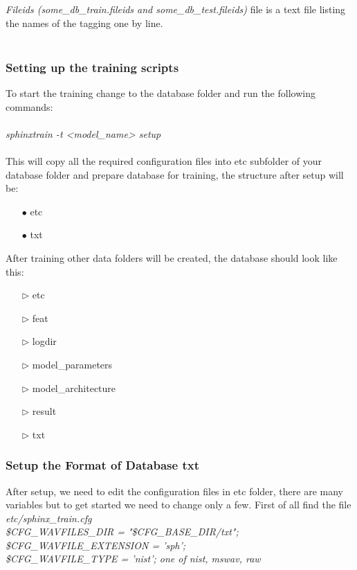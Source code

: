 \documentclass[12pt,a4paper,oneside]{memoir}
\begin{document}
\textit{Fileids (some\_db\_train.fileids and some\_db\_test.fileids)} file is a text file listing the names of the tagging one by line.
\\\\

\subsubsection{Setting up the training scripts}
To start the training change to the database folder and run the following commands:\\\\
\textit{sphinxtrain -t <model\_name> setup}\\\\

This will copy all the required configuration files into etc subfolder of your database folder and prepare database for training, the structure after setup will be: 
\begin{itemize}
  \item[$\bullet$] etc
  \item[$\bullet$] txt
\end{itemize}

After training other data folders will be created, the database should look like this: 

\begin{itemize}
	
  \item[$\triangleright$] etc
  \item[$\triangleright$] feat 
  \item[$\triangleright$] logdir
  \item[$\triangleright$]model\_parameters
  \item[$\triangleright$]model\_architecture
  \item[$\triangleright$]result
  \item[$\triangleright$]txt
\end{itemize}


\subsubsection{Setup the Format of Database txt}
After setup, we need to edit the configuration files in etc folder, there are many variables but to get started we need to change only a few. First of all find the file \textit{etc/sphinx\_train.cfg}\\
\textit{
\$CFG\_WAVFILES\_DIR = "\$CFG\_BASE\_DIR/txt";\\
\$CFG\_WAVFILE\_EXTENSION = 'sph';\\
\$CFG\_WAVFILE\_TYPE = 'nist';  one of nist, mswav, raw
}
\end{document}
